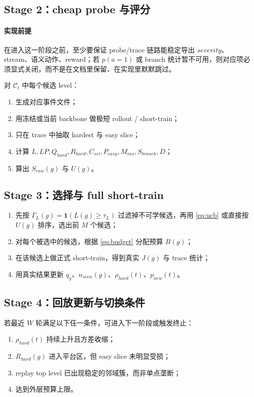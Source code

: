 \documentclass[11pt,a4paper]{ctexart}
\newcommand{\I}{\mathbf{1}}
\begin{document}
\subsection{Stage 2：cheap probe 与评分}
\paragraph{实现前提}
在进入这一阶段之前，至少要保证 probe/trace 链路能稳定导出 \(severity\)、stream、语义动作、reward；若 \(p(a=1)\) 或 branch 统计暂不可用，则对应项必须显式关闭，而不是在文档里保留、在实现里默默跳过。

对 \(\mathcal{C}_t\) 中每个候选 level：
\begin{enumerate}[leftmargin=2.2em,itemsep=0.25em]
    \item 生成对应事件文件；
    \item 用冻结或当前 backbone 做极短 rollout / short-train；
    \item 只在 trace 中抽取 hardest 与 easy slice；
    \item 计算 \(L, LP, Q_{hard}, R_{hard}, C_{sel}, P_{easy}, M_{ins}, S_{branch}, D\)；
    \item 算出 \(S_{raw}(g)\) 与 \(U(g)\)。
\end{enumerate}

\subsection{Stage 3：选择与 full short-train}
\begin{enumerate}[leftmargin=2.2em,itemsep=0.25em]
    \item 先按 \(\Gamma_L(g)=\I(L(g)\ge \tau_L)\) 过滤掉不可学候选，再用 \eqref{eq:ucb} 或直接按 \(U(g)\) 排序，选出前 \(M\) 个候选；
    \item 对每个被选中的候选，根据 \eqref{eq:budget} 分配预算 \(B(g)\)；
    \item 在该候选上做正式 short-train，得到真实 \(J(g)\) 与 trace 统计；
    \item 用真实结果更新 \(q_g\)、\(n_{seen}(g)\)、\(\rho_{hard}(t)\)、\(p_{new}(t)\)。
\end{enumerate}

\subsection{Stage 4：回放更新与切换条件}
若最近 \(W\) 轮满足以下任一条件，可进入下一阶段或触发终止：
\begin{enumerate}[leftmargin=2.2em,itemsep=0.25em]
    \item \(\rho_{hard}(t)\) 持续上升且方差收缩；
    \item \(R_{hard}(g)\) 进入平台区，但 easy slice 未明显受损；
    \item replay top level 已出现稳定的邻域簇，而非单点垄断；
    \item 达到外层预算上限。
\end{enumerate}
\end{document}
